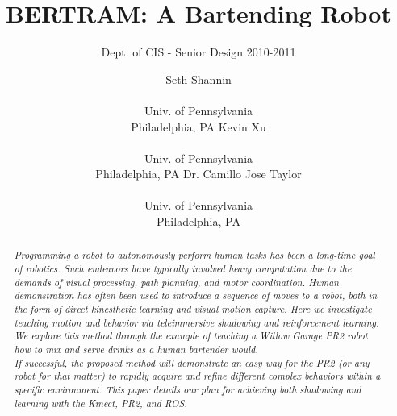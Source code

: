 \documentclass{sig-alternate}
\begin{document}
 

\title{BERTRAM: A Bartending Robot}

\subtitle{Dept. of CIS - Senior Design 2010-2011}
\author{
\alignauthor Seth Shannin \\  \\ Univ. of Pennsylvania \\ Philadelphia, PA
\alignauthor Kevin Xu \\  \\ Univ. of Pennsylvania \\ Philadelphia, PA
\alignauthor Dr. Camillo Jose Taylor \\  \\ Univ. of Pennsylvania \\ Philadelphia, PA}
\date{}
\maketitle

\begin{abstract}
\textit{Programming a robot to autonomously perform human tasks has been a long-time goal of robotics. Such endeavors have typically involved heavy computation due to the demands of visual processing, path planning, and motor coordination. Human demonstration has often been used to introduce a sequence of moves to a robot, both in the form of direct kinesthetic learning and visual motion capture. 
Here we investigate teaching motion and behavior via teleimmersive shadowing 
and reinforcement learning. We explore this method through the example of
teaching a Willow Garage PR2 robot how to mix and serve drinks as a human 
bartender would.
\\If successful, the proposed method will demonstrate an easy way for the PR2 (or any robot for that matter) to rapidly acquire and
 refine different complex behaviors within a specific environment. This paper details our plan for achieving both shadowing and learning with the Kinect, PR2, and ROS.}
\end{abstract}

\end{document}
